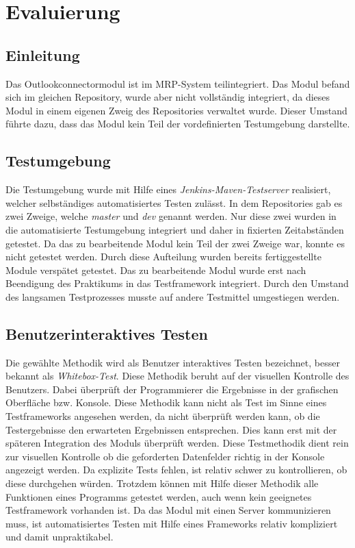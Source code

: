 \chapter{Evaluierung}
\section{Einleitung}
Das Outlookconnectormodul ist im MRP-System teilintegriert. Das Modul befand sich im gleichen Repository, wurde aber nicht vollständig integriert, da dieses Modul in einem eigenen Zweig des Repositories verwaltet wurde. Dieser Umstand führte dazu, dass das Modul kein Teil der vordefinierten Testumgebung darstellte. 
\section{Testumgebung}
Die Testumgebung wurde mit Hilfe eines \textit{Jenkins-Maven-Testserver} realisiert, welcher selbständiges automatisiertes Testen zulässt. In dem Repositories gab es zwei Zweige, welche \textit{master} und \textit{dev} genannt werden. Nur diese zwei wurden in die automatisierte Testumgebung integriert und daher in fixierten Zeitabständen getestet. Da das zu bearbeitende Modul kein Teil der zwei Zweige war, konnte es nicht getestet werden. Durch diese Aufteilung wurden bereits fertiggestellte Module verspätet getestet. Das zu bearbeitende Modul wurde erst nach Beendigung des Praktikums in das Testframework integriert. Durch den Umstand des langsamen Testprozesses musste auf andere Testmittel umgestiegen werden.
\section{Benutzerinteraktives Testen}
Die gewählte Methodik wird als Benutzer interaktives Testen bezeichnet, besser bekannt als \textit{Whitebox-Test}. Diese Methodik beruht auf der visuellen Kontrolle des Benutzers. Dabei überprüft der Programmierer die Ergebnisse in der grafischen Oberfläche bzw. Konsole. Diese Methodik kann nicht als Test im Sinne eines Testframeworks angesehen werden, da nicht überprüft werden kann, ob die Testergebnisse den erwarteten Ergebnissen entsprechen. Dies kann erst mit der späteren Integration des Moduls überprüft werden. Diese Testmethodik dient rein zur visuellen Kontrolle ob die geforderten Datenfelder richtig in der Konsole angezeigt werden. Da explizite Tests fehlen, ist relativ schwer zu kontrollieren, ob diese durchgehen würden. Trotzdem können mit Hilfe dieser Methodik alle Funktionen eines Programms getestet werden, auch wenn kein geeignetes Testframework vorhanden ist. Da das Modul mit einen Server kommunizieren muss, ist automatisiertes Testen mit Hilfe eines Frameworks relativ kompliziert und damit unpraktikabel. \\

